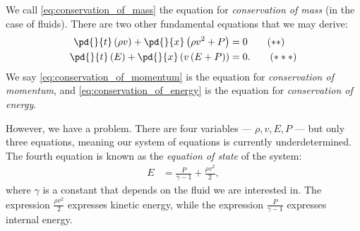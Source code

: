 \documentclass[10pt]{mypackage}
\begin{document}
We call \eqref{eq:conservation_of_mass} the equation for \textit{conservation of mass} (in the case of fluids). There are two other fundamental equations that we may derive:
\begin{align*}
  \pd{}{t}\left( \rho v \right) + \pd{}{x}\left( \rho v^2 + P \right) &= 0\label{eq:conservation_of_momentum}\tag{$\ast\ast$}\\
  \pd{}{t}\left( E \right) + \pd{}{x}\left( v\left( E + P \right) \right) &= 0.\label{eq:conservation_of_energy}\tag{$\ast\ast\ast$}
\end{align*}
We say \eqref{eq:conservation_of_momentum} is the equation for \textit{conservation of momentum}, and \eqref{eq:conservation_of_energy} is the equation for \textit{conservation of energy}.\newline

However, we have a problem. There are four variables --- $\rho,v,E,P$ --- but only three equations, meaning our system of equations is currently underdetermined. The fourth equation is known as the \textit{equation of state} of the system:
\begin{align*}
  E &= \frac{P}{\gamma - 1} + \frac{\rho v^2}{2},
\end{align*}
where $\gamma$ is a constant that depends on the fluid we are interested in. The expression $\frac{\rho v^2}{2}$ expresses kinetic energy, while the expression $\frac{P}{\gamma - 1}$ expresses internal energy.
\end{document}
